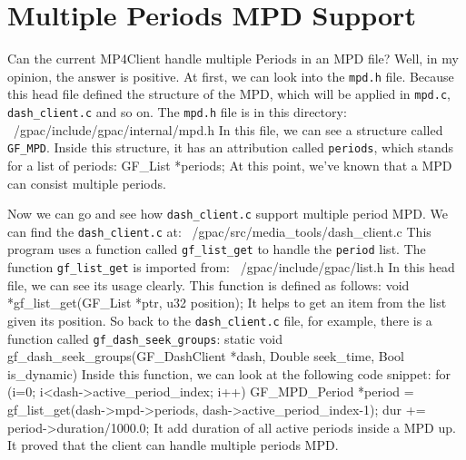 \documentclass{article}%
\newenvironment{code}%
   {\snugshade\verbatim}%
   {\endverbatim\endsnugshade}
\begin{document}
\section{Multiple Periods MPD Support}
\begin{Large}

Can the current MP4Client handle multiple Periods in an MPD file? Well, in my opinion, the answer is positive. At first, we can look into the \texttt{mpd.h} file. Because this head file defined the structure of the MPD, which will be applied in  \texttt{mpd.c}, \texttt{dash\_client.c} and so on. The \texttt{mpd.h} file is in this directory:
\begin{code}
    ~/gpac/include/gpac/internal/mpd.h
\end{code}
In this file, we can see a structure called \texttt{GF\_MPD}. Inside this structure, it has an attribution called \texttt{periods}, which stands for a list of periods:
\begin{code}
    GF_List *periods;
\end{code}
At this point, we've known that a MPD can consist multiple periods.

Now we can go and see how \texttt{dash\_client.c} support multiple period MPD. We can find the \texttt{dash\_client.c} at:
\begin{code}
    ~/gpac/src/media_tools/dash_client.c
\end{code}
This program uses a function called \texttt{gf\_list\_get} to handle the \texttt{period} list. The function \texttt{gf\_list\_get} is imported from:
\begin{code}
    ~/gpac/include/gpac/list.h
\end{code}
In this head file, we can see its usage clearly. This function is defined as follows:
\begin{code}
    void *gf_list_get(GF_List *ptr, u32 position);
\end{code}
It helps to get an item from the list given its position. So back to the \texttt{dash\_client.c} file, for example, there is a function called \texttt{gf\_dash\_seek\_groups}:
\begin{code}
    static void gf_dash_seek_groups(GF_DashClient *dash, 
        Double seek_time, Bool is_dynamic)
\end{code}
Inside this function, we can look at the following code snippet:
\begin{code}
    for (i=0; i<dash->active_period_index; i++) {
        GF_MPD_Period *period = gf_list_get(dash->mpd->periods, 
            dash->active_period_index-1);
        dur += period->duration/1000.0;
    }
\end{code}
\newpage
It add duration of all active periods inside a MPD up. It proved that the client can handle multiple periods MPD.

\end{Large}
\end{document}
